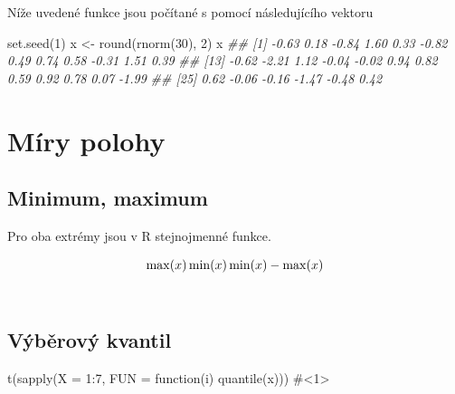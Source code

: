 \documentclass[
  letterpaper,
  DIV=11,
  numbers=noendperiod]{scrreprt}
\newenvironment{Shaded}{\begin{snugshade}}{\end{snugshade}}
\newcommand{\AttributeTok}[1]{\textcolor[rgb]{0.40,0.45,0.13}{#1}}
\newcommand{\CommentTok}[1]{\textcolor[rgb]{0.37,0.37,0.37}{#1}}
\newcommand{\ControlFlowTok}[1]{\textcolor[rgb]{0.00,0.23,0.31}{#1}}
\newcommand{\DecValTok}[1]{\textcolor[rgb]{0.68,0.00,0.00}{#1}}
\newcommand{\DocumentationTok}[1]{\textcolor[rgb]{0.37,0.37,0.37}{\textit{#1}}}
\newcommand{\FunctionTok}[1]{\textcolor[rgb]{0.28,0.35,0.67}{#1}}
\newcommand{\NormalTok}[1]{\textcolor[rgb]{0.00,0.23,0.31}{#1}}
\newcommand{\OtherTok}[1]{\textcolor[rgb]{0.00,0.23,0.31}{#1}}
\newcommand{\SpecialCharTok}[1]{\textcolor[rgb]{0.37,0.37,0.37}{#1}}
\begin{document}
Níže uvedené funkce jsou počítané s pomocí následujícího vektoru

\begin{Shaded}
\begin{Highlighting}[]
\FunctionTok{set.seed}\NormalTok{(}\DecValTok{1}\NormalTok{)}
\NormalTok{x }\OtherTok{\textless{}{-}} \FunctionTok{round}\NormalTok{(}\FunctionTok{rnorm}\NormalTok{(}\DecValTok{30}\NormalTok{), }\DecValTok{2}\NormalTok{)}
\NormalTok{x}
\DocumentationTok{\#\#  [1] {-}0.63  0.18 {-}0.84  1.60  0.33 {-}0.82  0.49  0.74  0.58 {-}0.31  1.51  0.39}
\DocumentationTok{\#\# [13] {-}0.62 {-}2.21  1.12 {-}0.04 {-}0.02  0.94  0.82  0.59  0.92  0.78  0.07 {-}1.99}
\DocumentationTok{\#\# [25]  0.62 {-}0.06 {-}0.16 {-}1.47 {-}0.48  0.42}
\end{Highlighting}
\end{Shaded}

\hypertarget{muxedry-polohy}{%
\section{Míry polohy}\label{muxedry-polohy}}

\hypertarget{minimum-maximum}{%
\subsection{Minimum, maximum}\label{minimum-maximum}}

Pro oba extrémy jsou v R stejnojmenné funkce.

\[
 \max(x)\\
 \min(x)\\
 \min(x) - \max(x)
\]\\

\hypertarget{vuxfdbux11brovuxfd-kvantil}{%
\subsection{Výběrový kvantil}\label{vuxfdbux11brovuxfd-kvantil}}

\hypertarget{annotated-cell-28}{%
\label{annotated-cell-28}}%
\begin{Shaded}
\begin{Highlighting}[]
\FunctionTok{t}\NormalTok{(}\FunctionTok{sapply}\NormalTok{(}\AttributeTok{X =} \DecValTok{1}\SpecialCharTok{:}\DecValTok{7}\NormalTok{, }\AttributeTok{FUN =} \ControlFlowTok{function}\NormalTok{(i) }\FunctionTok{quantile}\NormalTok{(x))) }\CommentTok{\#\textless{}1\textgreater{}}
\end{Highlighting}
\end{Shaded}
\end{document}
